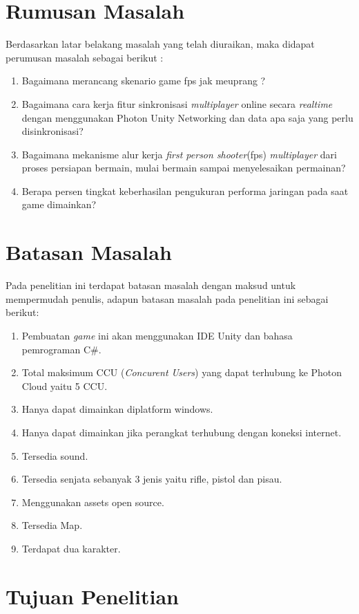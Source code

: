 \section{Rumusan Masalah}
\noindent

Berdasarkan latar belakang masalah yang telah diuraikan, maka didapat perumusan masalah sebagai berikut :
\begin{enumerate}
	\item Bagaimana merancang skenario game fps jak meuprang ?
	\item Bagaimana cara kerja fitur sinkronisasi \textit{multiplayer} online secara \textit{realtime} dengan menggunakan Photon Unity Networking dan data apa saja yang perlu disinkronisasi?
	\item Bagaimana mekanisme alur kerja \textit{first person shooter}(fps) \textit{multiplayer} dari proses persiapan bermain, mulai bermain sampai menyelesaikan permainan?
	\item Berapa persen tingkat keberhasilan pengukuran performa jaringan pada saat game dimainkan?
\end{enumerate}	

\section{Batasan Masalah}
\noindent

Pada penelitian ini terdapat batasan masalah dengan maksud untuk mempermudah penulis, adapun batasan masalah pada penelitian ini sebagai berikut:
\begin{enumerate}
	\item Pembuatan \textit{\textit{game}} ini akan menggunakan IDE Unity dan bahasa pemrograman C\#.
	\item Total maksimum CCU (\textit{Concurent Users}) yang dapat terhubung ke Photon Cloud yaitu 5 CCU.
	\item Hanya dapat dimainkan diplatform windows.
	\item Hanya dapat dimainkan jika perangkat terhubung dengan koneksi internet.
	\item Tersedia sound.
	\item Tersedia senjata sebanyak 3 jenis yaitu rifle, pistol dan pisau.
	\item Menggunakan assets open source.
	\item Tersedia Map.
	\item Terdapat dua karakter.
\end{enumerate}

\section{Tujuan Penelitian}
\noindent

